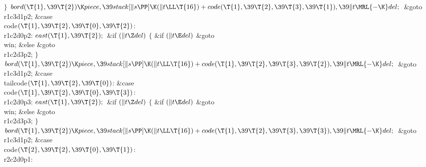 \2${}\}{}$\2\6
${}\\{bord}(\T{1},\39\T{2})\K\\{piece},\39\\{stack}[\|s\PP]\K(\|t\LL\T{16})+%
\\{code}(\T{1},\39\T{2},\39\T{3},\39\T{1}),\39\|t\MRL{-{\K}}\\{del};{}$\6
\&{goto} \\{r1c3d1p2};\6
\4\&{case} \\{code}${}(\T{1},\39\T{2},\39\T{0},\39\T{2}){}$:\5
\\{r1c2d0p2}:\5
${}\\{east}(\T{1},\39\T{2});{}$\6
\&{if} ${}(\|t\Z\\{del}){}$\5
${}\{{}$\5
\1\&{if} ${}(\|t\E\\{del}){}$\1\5
\&{goto} \\{win};\5
\2\&{else}\1\5
\&{goto} \\{r1c2d3p2};\5
\2${}\}{}$\2\6
${}\\{bord}(\T{1},\39\T{2})\K\\{piece},\39\\{stack}[\|s\PP]\K(\|t\LL\T{16})+%
\\{code}(\T{1},\39\T{2},\39\T{3},\39\T{2}),\39\|t\MRL{-{\K}}\\{del};{}$\6
\&{goto} \\{r1c3d1p2};\6
\4\&{case} \\{tailcode}${}(\T{1},\39\T{2},\39\T{0}){}$:\5
\&{case} \\{code}${}(\T{1},\39\T{2},\39\T{0},\39\T{3}){}$:\5
\\{r1c2d0p3}:\5
${}\\{east}(\T{1},\39\T{2});{}$\6
\&{if} ${}(\|t\Z\\{del}){}$\5
${}\{{}$\5
\1\&{if} ${}(\|t\E\\{del}){}$\1\5
\&{goto} \\{win};\5
\2\&{else}\1\5
\&{goto} \\{r1c2d3p3};\5
\2${}\}{}$\2\6
${}\\{bord}(\T{1},\39\T{2})\K\\{piece},\39\\{stack}[\|s\PP]\K(\|t\LL\T{16})+%
\\{code}(\T{1},\39\T{2},\39\T{3},\39\T{3}),\39\|t\MRL{-{\K}}\\{del};{}$\6
\&{goto} \\{r1c3d1p2};\6
\4\&{case} \\{code}${}(\T{2},\39\T{2},\39\T{0},\39\T{1}){}$:\5
\\{r2c2d0p1}:\5
